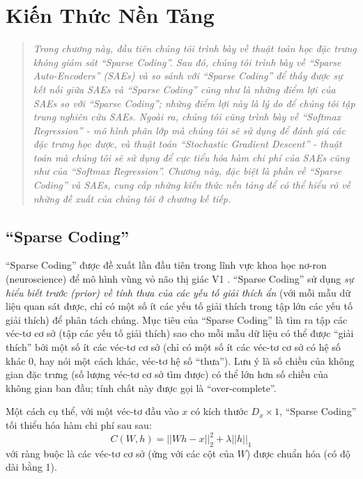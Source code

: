 \chapter{Kiến Thức Nền Tảng}
\ifpdf
    \graphicspath{{Chapter2/Chapter2Figs/PNG/}{Chapter2/Chapter2Figs/PDF/}{Chapter2/Chapter2Figs/}}
\else
    \graphicspath{{Chapter2/Chapter2Figs/EPS/}{Chapter2/Chapter2Figs/}}
\fi

\begin{quote}
\textit{Trong chương này, đầu tiên chúng tôi trình bày về thuật toán học đặc trưng không giám sát ``Sparse Coding''. Sau đó, chúng tôi trình bày về ``Sparse Auto-Encoders'' (SAEs) và so sánh với ``Sparse Coding'' để thấy được sự kết nối giữa SAEs và ``Sparse Coding'' cũng như là những điểm lợi của SAEs so với ``Sparse Coding''; những điểm lợi này là lý do để chúng tôi tập trung nghiên cứu SAEs. Ngoài ra, chúng tôi cũng trình bày về ``Softmax Regression'' - mô hình phân lớp mà chúng tôi sẽ sử dụng để đánh giá các đặc trưng học được, và thuật toán ``Stochastic Gradient Descent'' - thuật toán mà chúng tôi sẽ sử dụng để cực tiểu hóa hàm chi phí của SAEs cũng như của ``Softmax Regression''. Chương này, đặc biệt là phần về ``Sparse Coding'' và SAEs, cung cấp những kiến thức nền tảng để có thể hiểu rõ về những đề xuất của chúng tôi ở chương kế tiếp.}
\end{quote}
\section{``Sparse Coding''}
``Sparse Coding'' được đề xuất lần đầu tiên trong lĩnh vực khoa học nơ-ron (neuroscience) để mô hình vùng vỏ não thị giác V1 \cite{olshausen1996emergence}. ``Sparse Coding'' sử dụng \emph{sự hiểu biết trước (prior) về tính thưa của các yếu tố giải thích ẩn} (với mỗi mẫu dữ liệu quan sát được, chỉ có một số ít các yếu tố giải thích trong tập lớn các yếu tố giải thích) để phân tách chúng. Mục tiêu của ``Sparse Coding'' là tìm ra tập các véc-tơ cơ sở (tập các yếu tố giải thích) sao cho mỗi mẫu dữ liệu có thể được ``giải thích'' bởi một số ít các véc-tơ cơ sở (chỉ có một số ít các véc-tơ cơ sở có hệ số khác 0, hay nói một cách khác, véc-tơ hệ số ``thưa''). Lưu ý là số chiều của không gian đặc trưng (số lượng véc-tơ cơ sở tìm được) có thể lớn hơn số chiều của không gian ban đầu; tính chất này được gọi là ``over-complete''.

Một cách cụ thể, với một véc-tơ đầu vào $x$ có kích thước $D_x \times 1$, ``Sparse Coding'' tối thiểu hóa hàm chi phí sau sau:
\begin{equation} \label{eq_SparseCoding}
	C(W, h) = ||Wh - x||_2^2 + \lambda||h||_1
\end{equation}
với ràng buộc là các véc-tơ cơ sở (ứng với các cột của $W$) được chuẩn hóa (có độ dài bằng 1).

